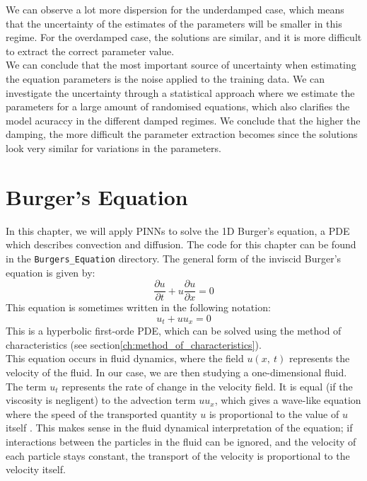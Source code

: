 \documentclass[we,twoside,openright,a4paper,11pt]{uantwerpenbamathesis}
\begin{document}
We can observe a lot more dispersion for the underdamped case, which means that the uncertainty of the estimates of the parameters will be smaller in this regime. For the overdamped case, the solutions are similar, and it is more difficult to extract the correct parameter value.\\

We can conclude that the most important source of uncertainty when estimating the equation parameters is the noise applied to the training data. We can investigate the uncertainty through a statistical approach where we estimate the parameters for a large amount of randomised equations, which also clarifies the model acuraccy in the different damped regimes. We conclude that the higher the damping, the more difficult the parameter extraction becomes since the solutions look very similar for variations in the parameters.

\chapter{Burger's Equation}
In this chapter, we will apply PINNs to solve the 1D Burger's equation, a PDE which describes convection and diffusion. The code for this chapter can be found in the \verb|Burgers_Equation| directory. The general form of the inviscid Burger's equation is given by:
\begin{equation}
    \frac{\partial u}{\partial t} + u\frac{\partial u}{\partial x}=0
\end{equation}
This equation is sometimes written in the following notation:
\begin{equation}
    u_t + uu_x = 0
\end{equation}
This is a hyperbolic first-orde PDE, which can be solved using the method of characteristics (see section\ref{ch:method_of_characteristics}).\\

This equation occurs in fluid dynamics, where the field $u(x,\ t)$ represents the velocity of the fluid. In our case, we are then studying a one-dimensional fluid. The term $u_t$ represents the rate of change in the velocity field. It is equal (if the viscosity is negligent) to the advection term $uu_x$, which gives a wave-like equation where the speed of the transported quantity $u$ is proportional to the value of $u$ itself \cite{vanremortel_einsle_2026}. This makes sense in the fluid dynamical interpretation of the equation; if interactions between the particles in the fluid can be ignored, and the velocity of each particle stays constant, the transport of the velocity is proportional to the velocity itself.\\
\end{document}
